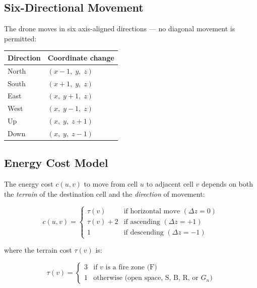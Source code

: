\documentclass[12pt]{article}
\begin{document}
\subsection{Six-Directional Movement}

The drone moves in six axis-aligned directions — no diagonal movement is
permitted:

\begin{center}
\begin{tabular}{@{} l l @{}}
\toprule
\textbf{Direction} & \textbf{Coordinate change} \\
\midrule
North  & $(x-1,\; y,\; z)$ \\
South  & $(x+1,\; y,\; z)$ \\
East   & $(x,\; y+1,\; z)$ \\
West   & $(x,\; y-1,\; z)$ \\
Up     & $(x,\; y,\; z+1)$ \\
Down   & $(x,\; y,\; z-1)$ \\
\bottomrule
\end{tabular}
\end{center}

\subsection{Energy Cost Model}

The energy cost $c(u, v)$ to move from cell $u$ to adjacent cell $v$ depends
on both the \emph{terrain} of the destination cell and the \emph{direction} of
movement:

\begin{equation}
c(u, v) =
\begin{cases}
\tau(v)       & \text{if horizontal move } (\Delta z = 0) \\
\tau(v) + 2   & \text{if ascending } (\Delta z = +1) \\
1             & \text{if descending } (\Delta z = -1)
\end{cases}
\end{equation}

where the terrain cost $\tau(v)$ is:

\begin{equation}
\tau(v) =
\begin{cases}
3 & \text{if } v \text{ is a fire zone (F)} \\
1 & \text{otherwise (open space, S, B, R, or } G_n\text{)}
\end{cases}
\end{equation}
\end{document}
